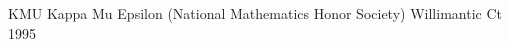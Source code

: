 

\begin{cvhonors}

  \cvhonor
    {KMU} %
    {Kappa Mu Epsilon (National Mathematics Honor Society)} 
    {Willimantic Ct} %
    {1995} %

\end{cvhonors}
